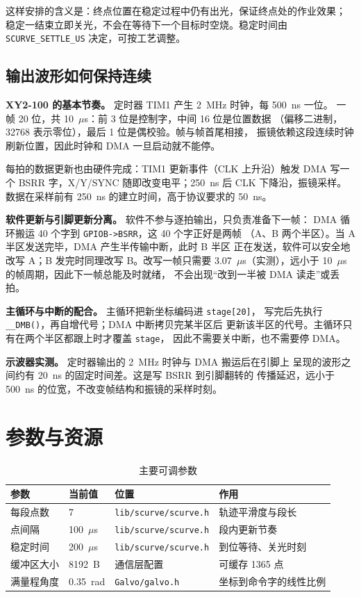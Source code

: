 \documentclass[UTF8,a4paper,11pt]{ctexart}
\begin{document}
这样安排的含义是：终点位置在稳定过程中仍有出光，保证终点处的作业效果；
稳定一结束立即关光，不会在等待下一个目标时空烧。稳定时间由
\texttt{SCURVE\_SETTLE\_US} 决定，可按工艺调整。

\subsection{输出波形如何保持连续}

\textbf{XY2-100 的基本节奏。} 定时器 TIM1 产生 2~MHz 时钟，每 500~ns 一位。
一帧 20 位，共 10~$\mu$s：前 3 位是控制字，中间 16 位是位置数据
（偏移二进制，32768 表示零位），最后 1 位是偶校验。帧与帧首尾相接，
振镜依赖这段连续时钟刷新位置，因此时钟和 DMA 一旦启动就不能停。

每拍的数据更新也由硬件完成：TIM1 更新事件（CLK 上升沿）触发 DMA 写一个
BSRR 字，X/Y/SYNC 随即改变电平；250~ns 后 CLK 下降沿，振镜采样。
数据在采样前有 250~ns 的建立时间，高于协议要求的 50~ns。

\textbf{软件更新与引脚更新分离。} 软件不参与逐拍输出，只负责准备下一帧：
DMA 循环搬运 40 个字到 \texttt{GPIOB->BSRR}，这 40 个字正好是两帧
（A、B 两个半区）。当 A 半区发送完毕，DMA 产生半传输中断，此时 B 半区
正在发送，软件可以安全地改写 A；B 发完时同理改写 B。改写一帧只需要
3.07~$\mu$s（实测），远小于 10~$\mu$s 的帧周期，因此下一帧总能及时就绪，
不会出现“改到一半被 DMA 读走”或丢拍。

\textbf{主循环与中断的配合。} 主循环把新坐标编码进 \texttt{stage[20]}，
写完后先执行 \texttt{\_\_DMB()}，再自增代号；DMA 中断拷贝完某半区后
更新该半区的代号。主循环只有在两个半区都跟上时才覆盖 \texttt{stage}，
因此不需要关中断，也不需要停 DMA。

\textbf{示波器实测。} 定时器输出的 2~MHz 时钟与 DMA 搬运后在引脚上
呈现的波形之间约有 20~ns 的固定时间差。这是写 BSRR 到引脚翻转的
传播延迟，远小于 500~ns 的位宽，不改变帧结构和振镜的采样时刻。

\section{参数与资源}

\begin{table}[htbp]
\centering
\caption{主要可调参数}
\begin{tabular}{@{}llll@{}}
\toprule
参数 & 当前值 & 位置 & 作用 \\
\midrule
每段点数 & 7 & \texttt{lib/scurve/scurve.h} & 轨迹平滑度与段长 \\
点间隔 & 100~$\mu$s & \texttt{lib/scurve/scurve.h} & 段内更新节奏 \\
稳定时间 & 200~$\mu$s & \texttt{lib/scurve/scurve.h} & 到位等待、关光时刻 \\
缓冲区大小 & 8192~B & 通信层配置 & 可缓存 1365 点 \\
满量程角度 & 0.35~rad & \texttt{Galvo/galvo.h} & 坐标到命令字的线性比例 \\
\bottomrule
\end{tabular}
\end{table}
\end{document}
